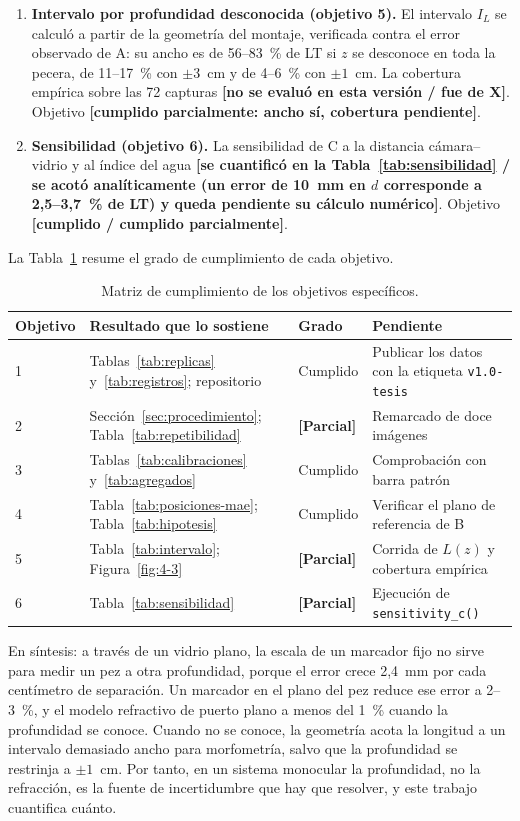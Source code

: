 \documentclass{report}
\newcommand{\IL}{I_L}
\newcommand{\pend}[1]{\textbf{[#1]}}
\newcommand{\RepoTag}{v1.0-tesis}
\begin{document}
\begin{enumerate}
  \item \textbf{Intervalo por profundidad desconocida (objetivo 5).} El intervalo $\IL$ se calculó a partir de la geometría del montaje, verificada contra el error observado de A: su ancho es de 56--83~\% de LT si $z$ se desconoce en toda la pecera, de 11--17~\% con $\pm 3$~cm y de 4--6~\% con $\pm 1$~cm. La cobertura empírica sobre las 72 capturas \pend{no se evaluó en esta versión / fue de X}. Objetivo \pend{cumplido parcialmente: ancho sí, cobertura pendiente}.
  \item \textbf{Sensibilidad (objetivo 6).} La sensibilidad de C a la distancia cámara--vidrio y al índice del agua \pend{se cuantificó en la Tabla~\ref{tab:sensibilidad} / se acotó analíticamente (un error de 10~mm en $d$ corresponde a 2,5--3,7~\% de LT) y queda pendiente su cálculo numérico}. Objetivo \pend{cumplido / cumplido parcialmente}.
\end{enumerate}

La Tabla~\ref{tab:cumplimiento} resume el grado de cumplimiento de cada objetivo.

\begin{table}[htbp]

\caption{Matriz de cumplimiento de los objetivos específicos.}
\label{tab:cumplimiento}
\begin{tabular}{@{}p{1.4cm} X p{1.8cm} X@{}}
\hline
Objetivo & Resultado que lo sostiene & Grado & Pendiente \\
\hline
1 & Tablas~\ref{tab:replicas} y~\ref{tab:registros}; repositorio & Cumplido & Publicar los datos con la etiqueta \texttt{\RepoTag} \\
2 & Sección~\ref{sec:procedimiento}; Tabla~\ref{tab:repetibilidad} & \pend{Parcial} & Remarcado de doce imágenes \\
3 & Tablas~\ref{tab:calibraciones} y~\ref{tab:agregados} & Cumplido & Comprobación con barra patrón \\
4 & Tabla~\ref{tab:posiciones-mae}; Tabla~\ref{tab:hipotesis} & Cumplido & Verificar el plano de referencia de B \\
5 & Tabla~\ref{tab:intervalo}; Figura~\ref{fig:4-3} & \pend{Parcial} & Corrida de $L(z)$ y cobertura empírica \\
6 & Tabla~\ref{tab:sensibilidad} & \pend{Parcial} & Ejecución de \texttt{sensitivity\_c()} \\
\hline
\end{tabular}
\end{table}

En síntesis: a través de un vidrio plano, la escala de un marcador fijo no sirve para medir un pez a otra profundidad, porque el error crece 2,4~mm por cada centímetro de separación. Un marcador en el plano del pez reduce ese error a 2--3~\%, y el modelo refractivo de puerto plano a menos del 1~\% cuando la profundidad se conoce. Cuando no se conoce, la geometría acota la longitud a un intervalo demasiado ancho para morfometría, salvo que la profundidad se restrinja a $\pm 1$~cm. Por tanto, en un sistema monocular la profundidad, no la refracción, es la fuente de incertidumbre que hay que resolver, y este trabajo cuantifica cuánto.
\end{document}

